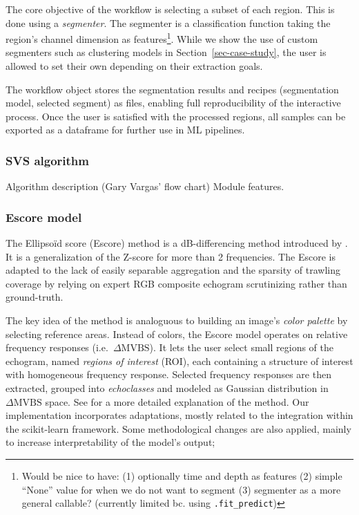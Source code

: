 \documentclass[
  10pt,
  letterpaper,
]{article}
\begin{document}
The core objective of the workflow is selecting a subset of each region.
This is done using a \emph{segmenter}. The segmenter is a classification
function taking the region's channel dimension as features\footnote{Would
  be nice to have: (1) optionally time and depth as features (2) simple
  ``None'' value for when we do not want to segment (3) segmenter as a
  more general callable? (currently limited bc. using
  \texttt{.fit\_predict})}. While we show the use of custom segmenters
such as clustering models in Section~\ref{sec-case-study}, the user is
allowed to set their own depending on their extraction goals.

The workflow object stores the segmentation results and recipes
(segmentation model, selected segment) as files, enabling full
reproducibility of the interactive process. Once the user is satisfied
with the processed regions, all samples can be exported as a dataframe
for further use in ML pipelines.

\subsubsection{SVS algorithm}\label{svs-algorithm}

Algorithm description (Gary Vargas' flow chart) Module features.

\subsubsection{Escore model}\label{escore-model}

The Ellipsoïd score (Escore) method is a dB-differencing method
introduced by \citet{annasawmy2024}. It is a generalization of the
Z-score \citep{derobertis2010} for more than 2 frequencies. The Escore
is adapted to the lack of easily separable aggregation and the sparsity
of trawling coverage by relying on expert RGB composite echogram
scrutinizing rather than ground-truth.

The key idea of the method is analoguous to building an image's
\emph{color palette} by selecting reference areas. Instead of colors,
the Escore model operates on relative frequency responses
(i.e.~\(\Delta \text{MVBS}\)). It lets the user select small regions of
the echogram, named \emph{regions of interest} (ROI), each containing a
structure of interest with homogeneous frequency response. Selected
frequency responses are then extracted, grouped into \emph{echoclasses}
and modeled as Gaussian distribution in \(\Delta \text{MVBS}\) space.
See \citet{annasawmy2024} for a more detailed explanation of the method.
Our implementation incorporates adaptations, mostly related to the
integration within the scikit-learn framework. Some methodological
changes are also applied, mainly to increase interpretability of the
model's output;
\end{document}
